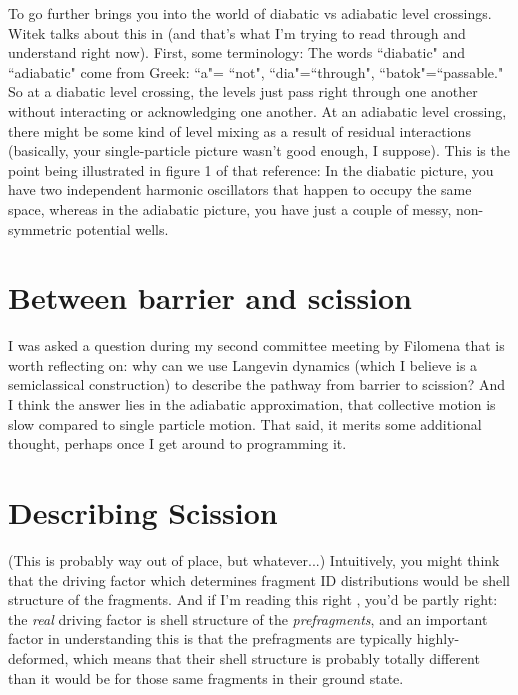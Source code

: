 To go further brings you into the world of diabatic vs adiabatic level crossings. Witek talks about this in \cite{Nazarewicz1993} (and that's what I'm trying to read through and understand right now). First, some terminology: The words ``diabatic" and ``adiabatic" come from Greek: ``a"= ``not", ``dia"=``through", ``batok"=``passable." So at a diabatic level crossing, the levels just pass right through one another without interacting or acknowledging one another. At an adiabatic level crossing, there might be some kind of level mixing as a result of residual interactions (basically, your single-particle picture wasn't good enough, I suppose). This is the point being illustrated in figure 1 of that reference: In the diabatic picture, you have two independent harmonic oscillators that happen to occupy the same space, whereas in the adiabatic picture, you have just a couple of messy, non-symmetric potential wells.

\section{Between barrier and scission}

I was asked a question during my second committee meeting by Filomena that is worth reflecting on: why can we use Langevin dynamics (which I believe is a semiclassical construction) to describe the pathway from barrier to scission? And I think the answer lies in the adiabatic approximation, that collective motion is slow compared to single particle motion. That said, it merits some additional thought, perhaps once I get around to programming it.

\section{Describing Scission}

(This is probably way out of place, but whatever...) Intuitively, you might think that the driving factor which determines fragment ID distributions would be shell structure of the fragments. And if I'm reading this right \cite[2nd paragraph + references]{Mcdonnell2014}, you'd be partly right: the \textit{real} driving factor is shell structure of the \textit{prefragments}, and an important factor in understanding this is that the prefragments are typically highly-deformed, which means that their shell structure is probably totally different than it would be for those same fragments in their ground state.